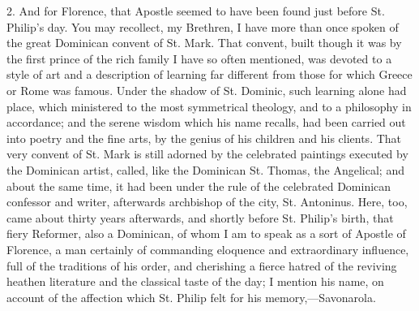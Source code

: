 2. And for Florence, that Apostle seemed to have been
found just before St. Philip's day. You may recollect, my
Brethren, I have more than once spoken of the great
Dominican convent of St. Mark. That convent, built though
it was by the first prince of the rich family I have so
often mentioned, was devoted to a style of art and a
description of learning far different from those for
which Greece or Rome was famous. Under the shadow of St.
Dominic, such learning alone had place, which ministered
to the most symmetrical theology, and to a philosophy in
accordance; and the serene wisdom which his name recalls,
had been carried out into poetry and the fine arts, by
the genius of his children and his clients. That very
convent of St. Mark is still adorned by the celebrated
paintings executed by the Dominican artist, called, like
the Dominican St. Thomas, the Angelical; and about the
same time, it had been under the rule of the celebrated
Dominican confessor and writer, afterwards archbishop of
the city, St. Antoninus. Here, too, came about thirty
years afterwards, and shortly before St. Philip's birth,
that fiery Reformer, also a Dominican, of whom I am to
speak as a sort of Apostle of Florence, a man certainly
of commanding eloquence and extraordinary influence, full
of the traditions of his order, and cherishing a fierce
hatred of the reviving heathen literature and the
classical taste of the day; I mention his name, on
account of the affection which St. Philip felt for his
memory,—Savonarola.

